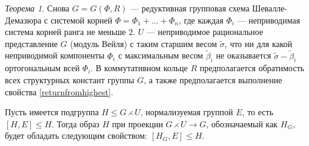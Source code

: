 \documentclass[10pt]{article}
\theoremstyle{break}
\theoremstyle{remark}
\newtheorem{thm}{Теорема}
\renewcommand{\le}{\leqslant}
\begin{document}
\begin{thm}\label{subgroupprojectionmain}
  Снова $G = G(\Phi, R)$ --- редуктивная групповая схема Шевалле-Демазюра
  с системой корней $\Phi = \Phi_1 + \ldots + \Phi_n$, где каждая $\Phi_i$ --- неприводимая система корней ранга не меньше $2$. $U$ --- неприводимое рациональное представление $G$ (модуль Вейля) с таким старшим весом $\widetilde\sigma$, что ни для какой неприводимой компоненты $\Phi_i$ с максимальным весом $\widetilde\beta_i$ не оказывается $\widetilde\sigma-\widetilde\beta_i$ ортогональным всей $\Phi_i$. В коммутативном кольце $R$ предполагается обратимость всех структурных констант группы $G$, а также предполагается выполнение свойства \ref{returnfromhighest}.
    
  Пусть имеется подгруппа $H \le G \rightthreetimes U$, нормализуемая группой $E$, то есть $[H,E] \le H$. Тогда образ $H$ при проекции $G \rightthreetimes U \rightarrow G$, обозначаемый как $H_G$, будет обладать следующим свойством: $[H_G,E]\le H$.
\end{thm}
\end{document}
